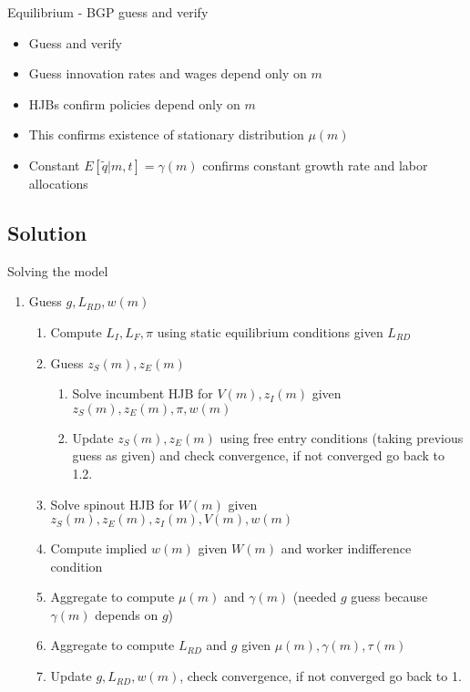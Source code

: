 \documentclass[english,usenames,dvipsnames]{beamer}
\begin{document}
\begin{frame}[label=confirming_bgp]{Equilibrium - BGP guess and verify}
\begin{itemize}
	\item Guess and verify 
	\item Guess innovation rates and wages depend only on $m$
	\item HJBs confirm policies depend only on $m$ \hyperlink{incumbent_BGP}{} \hyperlink{spinout_BGP}{}
	\item This confirms existence of stationary distribution $\mu(m)$ \hyperlink{mu_details}{}
	\item Constant $E[\tilde{q}|m,t] = \gamma(m)$ confirms constant growth rate and labor allocations \hyperlink{gamma_details}{} \hyperlink{aggregation_BGP}{}
\end{itemize}
\end{frame}

\subsection{Solution}

\begin{frame}{Solving the model}
\begin{enumerate}
	\small
	\item Guess $g, L_{RD}, w(m)$
	\begin{enumerate}
		\small
		\item Compute $L_I,L_F,\pi$ using static equilibrium conditions given $L_{RD}$ 
		\item Guess $z_S(m),z_E(m)$ 
		\begin{enumerate}
			\small
			\item Solve incumbent HJB for $V(m),z_I(m)$ given $z_S(m),z_E(m),\pi,w(m)$
			\item Update $z_S(m),z_E(m)$ using free entry conditions (taking previous guess as given) and check convergence, if not converged go back to 1.2.
		\end{enumerate}
		\item Solve spinout HJB for $W(m)$ given $z_S(m),z_E(m),z_I(m),V(m),w(m)$
		\item Compute implied $w(m)$ given $W(m)$ and worker indifference condition
		\item Aggregate to compute $\mu(m)$ and $\gamma(m)$ (needed $g$ guess because $\gamma(m)$ depends on $g$)
		\item Aggregate to compute $L_{RD}$ and $g$ given $\mu(m),\gamma(m),\tau(m)$
		\item Update $g,L_{RD},w(m)$, check convergence, if not converged go back to 1.
	\end{enumerate}
\end{enumerate}
\end{frame}
\end{document}
